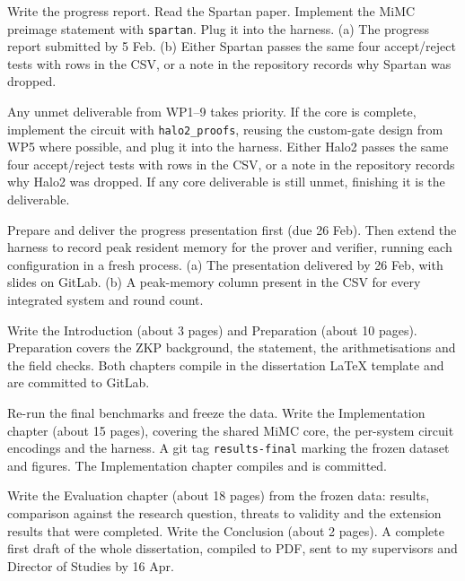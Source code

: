 \documentclass[11pt,a4paper]{article}
\begin{document}
{Write the progress report. Read the Spartan paper. Implement the MiMC preimage statement with \texttt{spartan}. Plug it into the harness.}
{(a) The progress report submitted by 5 Feb. (b) Either Spartan passes the same four accept/reject tests with rows in the CSV, or a note in the repository records why Spartan was dropped.}

{Any unmet deliverable from WP1--9 takes priority. If the core is complete, implement the circuit with \texttt{halo2\_proofs}, reusing the custom-gate design from WP5 where possible, and plug it into the harness.}
{Either Halo2 passes the same four accept/reject tests with rows in the CSV, or a note in the repository records why Halo2 was dropped. If any core deliverable is still unmet, finishing it is the deliverable.}

{Prepare and deliver the progress presentation first (due 26 Feb). Then extend the harness to record peak resident memory for the prover and verifier, running each configuration in a fresh process.}
{(a) The presentation delivered by 26 Feb, with slides on GitLab. (b) A peak-memory column present in the CSV for every integrated system and round count.}

{Write the Introduction (about 3 pages) and Preparation (about 10 pages). Preparation covers the ZKP background, the statement, the arithmetisations and the field checks.}
{Both chapters compile in the dissertation LaTeX template and are committed to GitLab.}

{Re-run the final benchmarks and freeze the data. Write the Implementation chapter (about 15 pages), covering the shared MiMC core, the per-system circuit encodings and the harness.}
{A git tag \texttt{results-final} marking the frozen dataset and figures. The Implementation chapter compiles and is committed.}

{Write the Evaluation chapter (about 18 pages) from the frozen data: results, comparison against the research question, threats to validity and the extension results that were completed. Write the Conclusion (about 2 pages).}
{A complete first draft of the whole dissertation, compiled to PDF, sent to my supervisors and Director of Studies by 16 Apr.}
\end{document}
